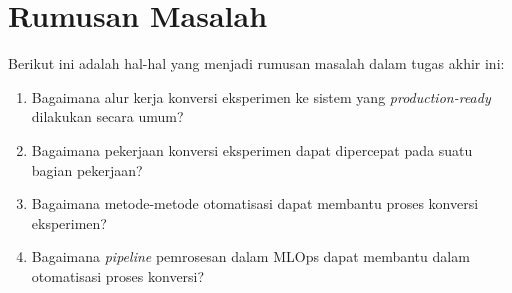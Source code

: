 \section{Rumusan Masalah}

Berikut ini adalah hal-hal yang menjadi rumusan masalah dalam tugas akhir ini:

\begin{enumerate}
    \item Bagaimana alur kerja konversi eksperimen ke sistem yang \textit{production-ready} dilakukan secara umum?
    \item Bagaimana pekerjaan konversi eksperimen dapat dipercepat pada suatu bagian pekerjaan?
    \item Bagaimana metode-metode otomatisasi dapat membantu proses  konversi eksperimen?
    \item Bagaimana \textit{pipeline} pemrosesan dalam MLOps dapat membantu dalam otomatisasi proses konversi?
\end{enumerate}